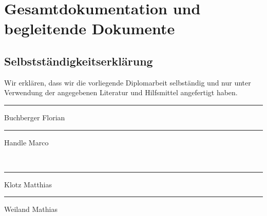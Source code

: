 \chapter[Gesamtdokumentation]{Gesamtdokumentation und begleitende Dokumente}

\section{Selbstständigkeitserklärung}

Wir erklären, dass wir die vorliegende Diplomarbeit selbständig und nur unter Verwendung der angegebenen Literatur und Hilfsmittel angefertigt haben.
\\[2cm]
\parbox{5cm}{\centering\hrule\medskip Buchberger Florian}
\vspace{2cm}
\hfill
\parbox{5cm}{\centering\hrule\medskip Handle Marco}
\vspace{2cm}
\\
\parbox{5cm}{\centering\hrule\medskip Klotz Matthias}
\vspace{2cm}
\hfill
\parbox{5cm}{\centering\hrule\medskip Weiland Mathias}
\vspace{2cm}

